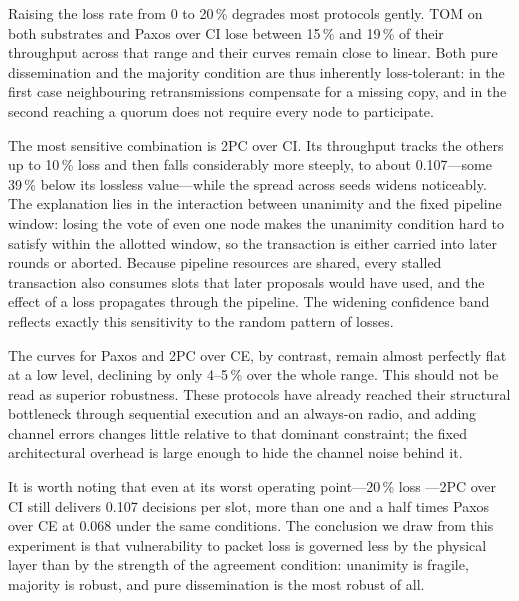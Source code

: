 \documentclass[journal]{IEEEtran}
\newcommand{\CI}{CI}                      %
\newcommand{\CE}{CE}                      %
\newcommand{\Nnodes}{N}                   %
\newcommand{\Diam}{D}                     %
\begin{document}

Raising the loss rate from 0 to 20\,\% degrades most protocols gently.
TOM on both substrates and Paxos over \CI{} lose between 15\,\% and
19\,\% of their throughput across that range and their curves remain
close to linear. Both pure dissemination and the majority condition are
thus inherently loss-tolerant: in the first case neighbouring
retransmissions compensate for a missing copy, and in the second reaching
a quorum does not require every node to participate.

The most sensitive combination is 2PC over \CI. Its throughput tracks the
others up to 10\,\% loss and then falls considerably more steeply, to
about 0.107---some 39\,\% below its lossless value---while the spread
across seeds widens noticeably. The explanation lies in the interaction
between unanimity and the fixed pipeline window: losing the vote of even
one node makes the unanimity condition hard to satisfy within the
allotted window, so the transaction is either carried into later rounds
or aborted. Because pipeline resources are shared, every stalled
transaction also consumes slots that later proposals would have used, and
the effect of a loss propagates through the pipeline. The widening
confidence band reflects exactly this sensitivity to the random pattern
of losses.

The curves for Paxos and 2PC over \CE, by contrast, remain almost
perfectly flat at a low level, declining by only 4--5\,\% over the whole
range. This should not be read as superior robustness. These protocols
have already reached their structural bottleneck through sequential
execution and an always-on radio, and adding channel errors changes
little relative to that dominant constraint; the fixed architectural
overhead is large enough to hide the channel noise behind it.

It is worth noting that even at its worst operating point---20\,\% loss
---2PC over \CI{} still delivers 0.107 decisions per slot, more than one
and a half times Paxos over \CE{} at 0.068 under the same conditions. The
conclusion we draw from this experiment is that vulnerability to packet
loss is governed less by the physical layer than by the strength of the
agreement condition: unanimity is fragile, majority is robust, and pure
dissemination is the most robust of all.
\end{document}

